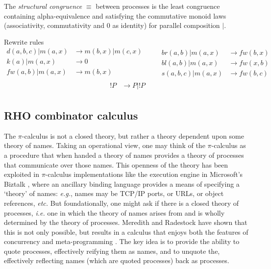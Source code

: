 \documentclass{llncs}
\newcommand{\pic}{$\pi$-calculus}
\newcommand{\pzero}{\mathbin{0}}
\newcommand{\scong}{\mathbin{\equiv}}
\newcommand{\red}{\rightarrow}
\begin{document}
\begin{definition}
  The {\em structural congruence} $\equiv$
  between processes \cite{SangiorgiWalker} is the least congruence containing
  alpha-equivalence and satisfying the commutative monoid laws
  (associativity, commutativity and $\pzero$ as identity) for parallel
  composition $|$.
\end{definition}

Rewrite rules
\[\begin{array}{rl}
  d(a,b,c) | m(a,x) & \red m(b,x) | m(c,x) \\
  k(a) | m(a,x) & \red 0 \\
  fw(a,b) | m(a,x) & \red m(b,x) \\
\end{array} \quad \quad
\begin{array}{rl}
  br(a,b) | m(a,x) & \red fw(b,x) \\
  bl(a,b) | m(a,x) & \red fw(x,b) \\
  s(a,b,c) | m(a,x) & \red fw(b,c)
\end{array}\]
\[\begin{array}{rl}
  !P & \red P|!P \\
\end{array}\]

\subsection{RHO combinator calculus}
The {\pic} is not a closed theory, but rather a theory dependent upon
some theory of names. Taking an operational view, one may think of the
{\pic} as a procedure that when handed a theory of names provides a
theory of processes that communicate over those names. This openness
of the theory has been exploited in {\pic} implementations like the
execution engine in Microsoft's Biztalk \cite{biztalk}, where an
ancillary binding language provides a means of specifying a `theory'
of names: {\em e.g.}, names may be TCP/IP ports, or URLs, or object
references, {\em etc.}  But foundationally, one might ask if there is
a closed theory of processes, {\em i.e.} one in which the theory of
names arises from and is wholly determined by the theory of
processes. Meredith and Radestock have shown that this is not only
possible, but results in a calculus that enjoys both the features of
concurrency and meta-programming
\cite{DBLP:journals/entcs/MeredithR05}. The key idea is to provide the
ability to quote processes, effectively reifying them as names, and to
unquote the, effectively reflecting names (which are quoted processes)
back as processes.
\end{document}
